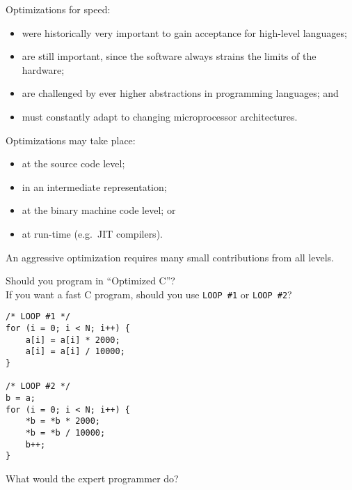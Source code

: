 \begin{slide*}
Optimizations for speed:
\begin{itemize}
\item were historically very important to gain acceptance for high-level languages;
\item are still important, since the software always strains the limits of the hardware;
\item are challenged by ever higher abstractions in programming languages; and
\item must constantly adapt to changing microprocessor architectures.
\end{itemize}
\vfil
\end{slide*}
 
\begin{slide*}
Optimizations may take place:
\begin{itemize}
\item at the source code level;
\item in an intermediate representation;
\item at the binary machine code level; or
\item at run-time (e.g.\ JIT compilers).
\end{itemize}
An aggressive optimization requires many small contributions from all levels.
\vfil
\end{slide*}

\begin{slide*}
Should you program in ``Optimized C''?\\

If you want a fast C program, 
should you use {\tt LOOP \#1} or {\tt LOOP \#2}? 

\begin{scriptsize}
\begin{verbatim}
/* LOOP #1 */
for (i = 0; i < N; i++) {
    a[i] = a[i] * 2000;
    a[i] = a[i] / 10000;
}

/* LOOP #2 */
b = a;
for (i = 0; i < N; i++) {
    *b = *b * 2000;
    *b = *b / 10000;
    b++;
}
\end{verbatim}
\end{scriptsize}
What would the expert programmer do?
\vfil
\end{slide*}

